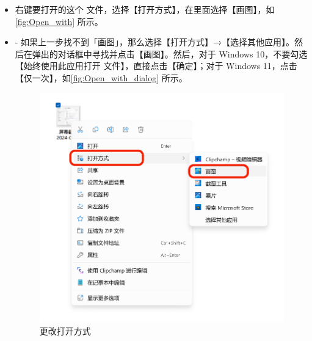 {{{{\begin{itemize}
  \item 右键要打开的这个  文件，选择【打开方式】，在里面选择【画图】，如\autoref{fig:Open_with} 所示。
  \item - 如果上一步找不到「画图」，那么选择【打开方式】→【选择其他应用】。然后在弹出的对话框中寻找并点击【画图】。然后，对于 Windows 10，不要勾选【始终使用此应用打开  文件】，直接点击【确定】；对于 Windows 11，点击【仅一次】，如\autoref{fig:Open_with_dialog} 所示。
    \begin{figure}[htb!]
      \centering
      \begin{minipage}{.55\textwidth}
        \centering
        \includegraphics[width=.98\textwidth]{assets/basic/Open_with.png}
        \caption{更改打开方式}
        \label{fig:Open_with}
      \end{minipage}
      \begin{minipage}{.43\textwidth}

\end{minipage}
\end{figure}
\end{itemize}}}}}
